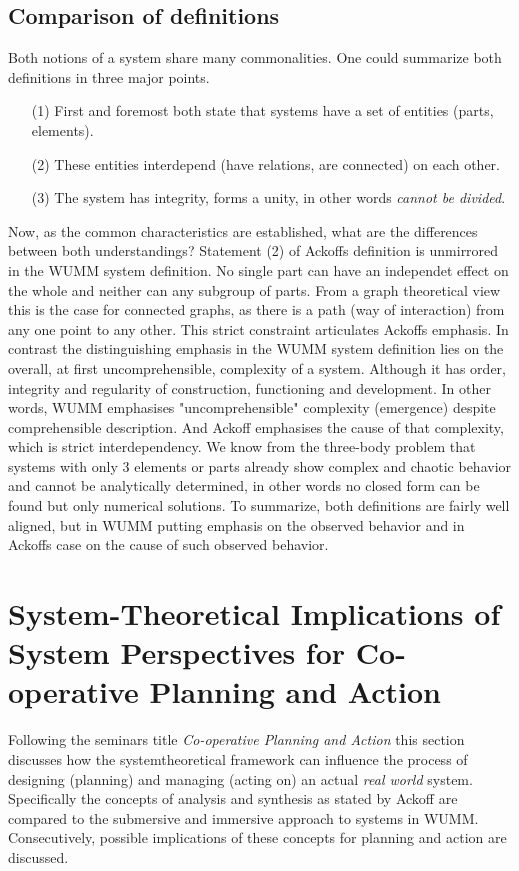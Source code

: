 \documentclass[a4paper,11pt]{article}
\begin{document}
\subsection{Comparison of definitions}
\label{subsec:Definition comparison}
Both notions of a system share many commonalities.  One could summarize both
definitions in three major points.  
\begin{itemize}
\item[(1)] First and foremost both state that systems have a set of
  entities (parts, elements). 
\item[(2)] These entities interdepend (have relations, are connected) on each
  other.  
\item[(3)] The system has integrity, forms a unity, in other words
  \emph{cannot be divided}.
\end{itemize}
Now, as the common characteristics are established, what are the differences
between both understandings?  Statement (2) of Ackoffs definition is
unmirrored in the WUMM system definition. No single part can have an
independet effect on the whole and neither can any subgroup of parts. From a
graph theoretical view this is the case for connected graphs, as there is a
path (way of interaction) from any one point to any other. This strict
constraint articulates Ackoffs emphasis. In contrast the distinguishing
emphasis in the WUMM system definition lies on the overall, at first
uncomprehensible, complexity of a system. Although it has order, integrity and
regularity of construction, functioning and development. In other words, WUMM
emphasises "uncomprehensible" complexity (emergence) despite comprehensible
description. And Ackoff emphasises the cause of that complexity, which is
strict interdependency. We know from the three-body problem that systems with
only 3 elements or parts already show complex and chaotic behavior and cannot
be analytically determined, in other words no closed form can be found but
only numerical solutions. To summarize, both definitions are fairly well
aligned, but in WUMM putting emphasis on the observed behavior and in Ackoffs
case on the cause of such observed behavior.

\section{System-Theoretical Implications of System Perspectives for
  Co-operative Planning and Action} 
\label{system_view_and_management}
Following the seminars title \emph{Co-operative Planning and Action} this
section discusses how the systemtheoretical framework can influence the
process of designing (planning) and managing (acting on) an actual
\textit{real world} system. Specifically the concepts of analysis and
synthesis as stated by Ackoff are compared to the submersive and immersive
approach to systems in WUMM. Consecutively, possible implications of these
concepts for planning and action are discussed.
\end{document}
